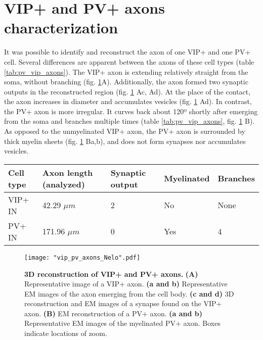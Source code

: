 \section{VIP+ and PV+ axons characterization}
\label{sec:VIP and PV axon}
It was possible to identify and reconstruct the axon of one VIP+ and one PV+ cell. Several differences are apparent between the axons of these cell types (table \ref{tab:pv_vip_axons}). The VIP+ axon is extending relatively straight from the soma, without branching (fig. \ref{fig:vip_pv_axons}A). Additionally, the axon formed two synaptic outputs in the reconstructed region (fig. \ref{fig:vip_pv_axons} Ac, Ad). At the place of the contact, the axon increases in diameter and accumulates vesicles (fig. \ref{fig:vip_pv_axons} Ad).
In contrast, the PV+ axon is more irregular. It curves back about 120º shortly after emerging from the soma and branches multiple times (table \ref{tab:pv_vip_axons}, fig. \ref{fig:vip_pv_axons} B). As opposed to the unmyelinated VIP+ axon, the PV+ axon is surrounded by thick myelin sheets (fig. \ref{fig:vip_pv_axons} Ba,b), and does not form synapses nor accumulates vesicles. \\
\label{tab:pv_vip_axons}
\begin{tabular}{|l|l|l|l|l|}
	\hline
	Cell type & Axon length (analyzed) & Synaptic output & Myelinated & Branches\\
	\hline
	VIP+ IN & 42.29 $\mu m$ & 2 & No & None\\
	\hline
	PV+ IN & 171.96 $\mu m$ & 0 & Yes & 4\\
	\hline
\end{tabular}
\begin{figure}
	\captionsetup[figure]{indentation=0pt}
	\texttt{[image: "vip\_pv\_axons\_Nelo".pdf]}
	\caption{\textbf{3D reconstruction of VIP+ and PV+ axons.} \textbf{(A)} Representative image of a VIP+ axon. \textbf{(a and b)} Representative EM images of the axon emerging from the cell body. \textbf{(c and d)} 3D reconstruction and EM images of a synapse found on the VIP+ axon. \textbf{(B)} EM reconstruction of a PV+ axon. \textbf{(a and b)} Representative EM images of the myelinated PV+ axon. Boxes indicate locations of zoom.}
	\label{fig:vip_pv_axons}
\end{figure}

